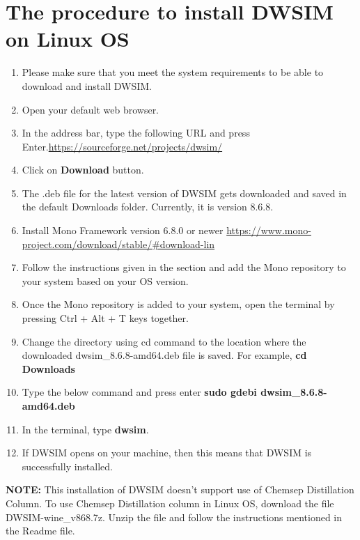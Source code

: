 \documentclass[a4paper,12pt]{article}
\begin{document}
\section{The procedure to install DWSIM on Linux OS}

\begin{enumerate}
\item Please make sure that you meet the system requirements to be able to download and install DWSIM.
\item Open your default web browser.
\item In the address bar, type the following URL and press Enter.\newline \url{https://sourceforge.net/projects/dwsim/}
\item Click on \textbf{Download} button.
\item The .deb file for the latest version of DWSIM gets downloaded and saved in the default Downloads folder. Currently, it is version 8.6.8.
\item Install Mono Framework version 6.8.0 or newer
\newline \url{https://www.mono-project.com/download/stable/#download-lin}
\item Follow the instructions given in the section and add the Mono repository to your system based on your OS version. 
\item Once the Mono repository is added to your system, open the terminal by pressing Ctrl + Alt + T keys together.
\item Change the directory using cd command to the location where the downloaded dwsim\_8.6.8-amd64.deb file is saved. For example, \textbf{cd Downloads}
\item Type the below command and press enter
\newline \textbf{sudo gdebi dwsim\_8.6.8-amd64.deb}
\item In the terminal, type \textbf{dwsim}.
\item If DWSIM opens on your machine, then this means that DWSIM is successfully installed.

\end{enumerate}

\noindent \textbf{NOTE:} This installation of DWSIM doesn't support use of Chemsep Distillation Column. To use Chemsep Distillation column in Linux OS, download the file DWSIM-wine\_v868.7z. Unzip the file and follow the instructions mentioned in the Readme file.
\end{document}
